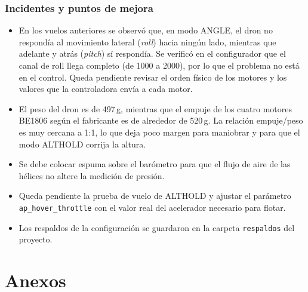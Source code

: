 \documentclass[pdflatex,sn-mathphys-num]{sn-jnl}%
\begin{document}
\subsubsection{Incidentes y puntos de mejora}
\begin{itemize}
    \item En los vuelos anteriores se observó que, en modo ANGLE, el dron no respondía al movimiento lateral (\textit{roll}) hacia ningún lado, mientras que adelante y atrás (\textit{pitch}) sí respondía. Se verificó en el configurador que el canal de roll llega completo (de 1000 a 2000), por lo que el problema no está en el control. Queda pendiente revisar el orden físico de los motores y los valores que la controladora envía a cada motor.
    \item El peso del dron es de 497\,g, mientras que el empuje de los cuatro motores BE1806 según el fabricante es de alrededor de 520\,g. La relación empuje/peso es muy cercana a 1:1, lo que deja poco margen para maniobrar y para que el modo ALTHOLD corrija la altura.
    \item Se debe colocar espuma sobre el barómetro para que el flujo de aire de las hélices no altere la medición de presión.
    \item Queda pendiente la prueba de vuelo de ALTHOLD y ajustar el parámetro \texttt{ap\_hover\_throttle} con el valor real del acelerador necesario para flotar.
    \item Los respaldos de la configuración se guardaron en la carpeta \texttt{respaldos} del proyecto.
\end{itemize}
\newpage
\section{Anexos}

\appendix
\renewcommand{\thesubsection}{\Roman{subsection}}
\end{document}
